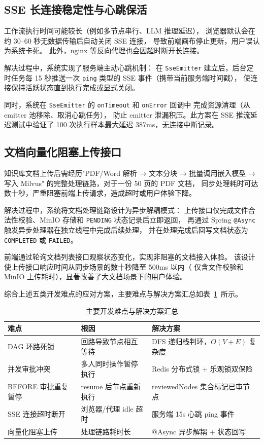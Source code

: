 \subsection{SSE 长连接稳定性与心跳保活}


工作流执行时间可能较长（例如多节点串行、LLM 推理延迟），
浏览器默认会在约 30--60 秒无数据传输后自动关闭 SSE 连接，
导致前端画布停止更新，用户误认为系统卡死。
此外，nginx 等反向代理也会因超时断开长连接。


解决过程中，系统实现了服务端主动心跳机制：
在 \texttt{SseEmitter} 建立后，后台定时任务每 15 秒推送一次
\texttt{ping} 类型的 SSE 事件（携带当前服务端时间戳），
使连接保持活跃状态直到执行完成或显式关闭。

同时，系统在 \texttt{SseEmitter} 的 \texttt{onTimeout} 和 \texttt{onError} 回调中
完成资源清理（从 emitter 池移除、取消心跳任务），
防止 emitter 泄漏积压。此方案在 SSE 推流延迟测试中验证了
100 次执行样本最大延迟 387ms，无连接中断记录。

\subsection{文档向量化阻塞上传接口}


知识库文档上传后需经历"PDF/Word 解析 → 文本分块 → 批量调用嵌入模型 → 写入 Milvus"
的完整处理链路，对于一份 50 页的 PDF 文档，
同步处理耗时可达数十秒，严重阻塞前端上传请求，造成超时或用户体验下降。


解决过程中，系统将文档处理链路设计为异步解耦模式：
上传接口仅完成文件合法性校验、MinIO 存储和 \texttt{PENDING} 状态记录后立即返回，
再通过 Spring \texttt{@Async} 触发异步处理器在独立线程中完成后续处理，
并在处理完成后回写文档状态为 \texttt{COMPLETED} 或 \texttt{FAILED}。

前端通过轮询文档列表接口观察状态变化，实现非阻塞的文档接入体验。
该设计使上传接口响应时间从同步场景的数十秒降至 500ms 以内（
仅含文件校验和 MinIO 上传耗时），显著改善了大文档场景下的用户体验。

综合上述五类开发难点的应对方案，主要难点与解决方案汇总如表~\ref{tab:dev_challenges}~所示。

\begin{table}[H]
  \centering
  \caption{主要开发难点与解决方案汇总}
  \label{tab:dev_challenges}
  \begin{tabular}{p{3.2cm}p{4.2cm}p{5.2cm}}
    \toprule
    难点 & 根因 & 解决方案 \\
    \midrule
    DAG 环路死锁 & 回路导致节点相互等待 & DFS 递归栈判环，$O(V+E)$ 复杂度 \\
    并发审批冲突 & 多人同时操作暂停执行 & Redis 分布式锁 + 乐观锁双保险 \\
    BEFORE 审批重复暂停 & resume 后节点重新执行 & reviewedNodes 集合标记已审节点 \\
    SSE 连接超时断开 & 浏览器/代理 idle 超时 & 服务端 15s 心跳 ping 事件 \\
    向量化阻塞上传 & 处理链路耗时长 & @Async 异步解耦 + 状态回写 \\
    \bottomrule
  \end{tabular}
\end{table}

